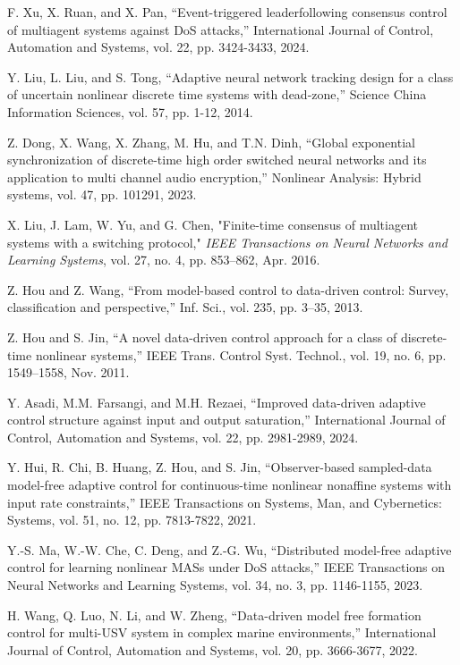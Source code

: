 \documentclass[journal,onecolumn]{IEEEtran}
\begin{document}
\begin{thebibliography}{99}
    
    F. Xu, X. Ruan, and X. Pan, “Event-triggered leaderfollowing consensus control of multiagent systems against DoS attacks,” International Journal of Control, Automation and Systems, vol. 22, pp. 3424-3433, 2024.
    
    Y. Liu, L. Liu, and S. Tong, “Adaptive neural network tracking design for a class of uncertain nonlinear discrete time systems with dead-zone,” Science China Information
    Sciences, vol. 57, pp. 1-12, 2014.
    
    Z. Dong, X. Wang, X. Zhang, M. Hu, and T.N. Dinh, “Global exponential synchronization of discrete-time high order switched neural networks and its application to multi channel audio encryption,” Nonlinear Analysis: Hybrid
    systems, vol. 47, pp. 101291, 2023.
    
    X. Liu, J. Lam, W. Yu, and G. Chen, "Finite-time consensus of multiagent systems with a switching protocol," \emph{IEEE Transactions on Neural Networks and Learning Systems}, vol. 27, no. 4, pp. 853–862, Apr. 2016.

    Z. Hou and Z. Wang, “From model-based control to data-driven control:
    Survey, classification and perspective,” Inf. Sci., vol. 235, pp. 3–35, 2013.

    Z. Hou and S. Jin, “A novel data-driven control approach for a class
    of discrete-time nonlinear systems,” IEEE Trans. Control Syst. Technol.,
    vol. 19, no. 6, pp. 1549–1558, Nov. 2011.

    Y. Asadi, M.M. Farsangi, and M.H. Rezaei, “Improved data-driven adaptive control structure against input and output saturation,” International Journal of Control, Automation and Systems, vol. 22, pp. 2981-2989, 2024.

    Y. Hui, R. Chi, B. Huang, Z. Hou, and S. Jin, “Observer-based sampled-data model-free adaptive control for continuous-time nonlinear nonaffine systems with input rate constraints,” IEEE Transactions on Systems, Man, and Cybernetics: Systems, vol. 51, no. 12, pp. 7813-7822, 2021.

    Y.-S. Ma, W.-W. Che, C. Deng, and Z.-G. Wu, “Distributed model-free adaptive control for learning nonlinear MASs under DoS attacks,” IEEE Transactions on Neural Networks and Learning Systems, vol. 34, no. 3, pp. 1146-1155, 2023.

    H. Wang, Q. Luo, N. Li, and W. Zheng, “Data-driven model free formation control for multi-USV system in complex marine environments,” International Journal of Control,
    Automation and Systems, vol. 20, pp. 3666-3677, 2022.


\end{thebibliography}
\end{document}
